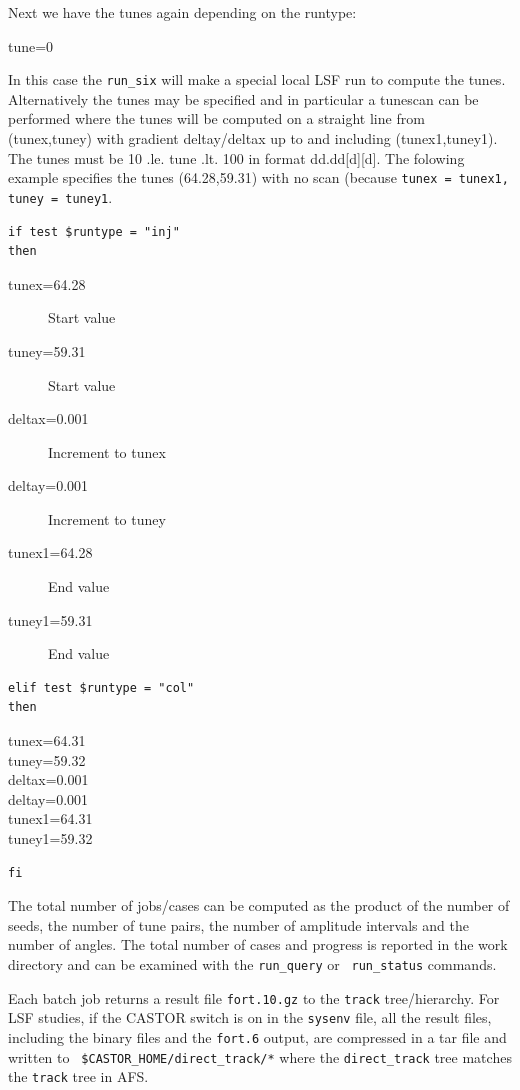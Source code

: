 \documentclass{cernatsnote}
\begin{document}
Next we have the tunes again depending on the runtype:
\begin{description} 
\item[tune=0]
\end{description} 
In this case the {\tt run\_six} will make a special local LSF run to compute
the tunes. Alternatively the tunes may be specified and in particular a
tunescan can be performed where the tunes will be computed on a straight line
from (tunex,tuney) with gradient deltay/deltax up to and including
(tunex1,tuney1).  The tunes must be 10 .le. tune .lt. 100 in format
dd.dd[d][d].  The folowing example specifies the tunes (64.28,59.31) with no
scan (because {\tt tunex = tunex1, tuney = tuney1}. 
\begin{verbatim}
if test $runtype = "inj"
then
\end{verbatim}
\begin{description}
\item[tunex=64.28] Start value
\item[tuney=59.31] Start value
\item[deltax=0.001] Increment to tunex
\item[deltay=0.001] Increment to tuney
\item[tunex1=64.28] End value
\item[tuney1=59.31] End value
\end{description}
\begin{verbatim}
elif test $runtype = "col"
then
\end{verbatim}
\begin{description}
\item[tunex=64.31]
\item[tuney=59.32]
\item[deltax=0.001]
\item[deltay=0.001]
\item[tunex1=64.31]
\item[tuney1=59.32]
\end{description}
\begin{verbatim}
fi
\end{verbatim}
The total number of jobs/cases can be computed as the product of the number of
seeds, the number of tune pairs, the number of amplitude intervals and the
number of angles.  The total number of cases and progress is reported in the
work directory and can be examined with the {\tt run\_query} or {\tt
run\_status} commands.

Each batch job returns a result file {\tt fort.10.gz} to the {\tt track}
tree/hierarchy. For LSF studies, if the CASTOR switch is on in the {\tt sysenv}
file, all the result files, including the binary files and the {\tt fort.6}
output, are compressed in a tar file and written to {\tt
\$CASTOR\_HOME/direct\_track/*} where the {\tt direct\_track} tree matches the
{\tt track} tree in AFS.
\end{document}
